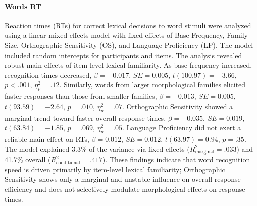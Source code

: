 \documentclass[utf8]{FrontiersinHarvard} %
\begin{document}
	\paragraph*{Words RT}
	Reaction times (RTs) for correct lexical decisions to word stimuli were analyzed using a linear mixed-effects model with fixed effects of Base Frequency, Family Size, Orthographic Sensitivity (OS), and Language Proficiency (LP). The model included random intercepts for participants and items. The analysis revealed robust main effects of item-level lexical familiarity. As base frequency increased, recognition times decreased, $\beta = -0.017$, $SE = 0.005$, $t(100.97) = -3.66$, $p < .001$, $\eta^2_p = .12$. Similarly, words from larger morphological families elicited faster responses than those from smaller families, $\beta = -0.013$, $SE = 0.005$, $t(93.59) = -2.64$, $p = .010$, $\eta^2_p = .07$. Orthographic Sensitivity showed a marginal trend toward faster overall response times, $\beta = -0.035$, $SE = 0.019$, $t(63.84) = -1.85$, $p = .069$, $\eta^2_p = .05$. Language Proficiency did not exert a reliable main effect on RTs, $\beta = 0.012$, $SE = 0.012$, $t(63.97) = 0.94$, $p = .35$. The model explained 3.3\% of the variance via fixed effects ($R^2_{\mathrm{marginal}} = .033$) and 41.7\% overall ($R^2_{\mathrm{conditional}} = .417$). These findings indicate that word recognition speed is driven primarily by item-level lexical familiarity; Orthographic Sensitivity shows only a marginal and unstable influence on overall response efficiency and does not selectively modulate morphological effects on response times.
	
\end{document}
